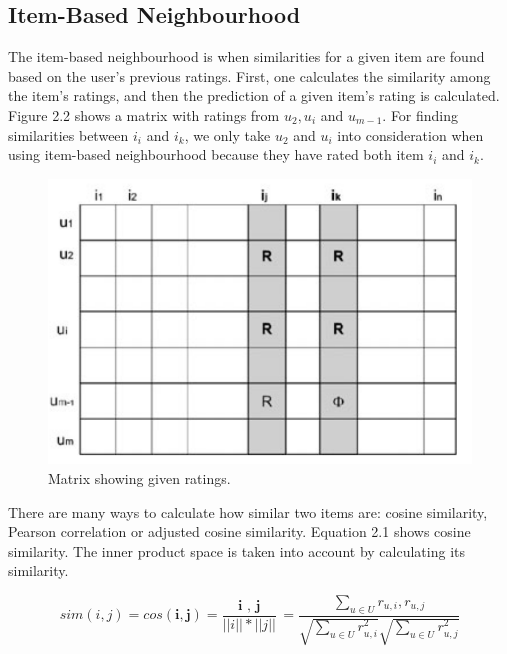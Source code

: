 \subsection{Item-Based Neighbourhood }

The item-based neighbourhood is when similarities for a given item are found based on the user's previous ratings. First, one calculates the similarity among the item's ratings, and then the prediction of a given item's rating is calculated. Figure 2.2 shows a matrix with ratings from  $u_{2}, u_{i}$ and $u_{m-1}$. For finding similarities between $i_{i}$ and $i_{k}$, we only take $u_{2}$ and  $u_{i}$ into consideration when using item-based neighbourhood because they have rated both item $i_{i}$ and $i_{k}$.  

\begin{figure}[H]
	\includegraphics[scale=0.65]{images/neigbourhood_based}
	\centering
	\caption{Matrix showing given ratings. \citep{celma_recommendation_2010}} 
\end{figure}

There are many ways to calculate how similar two items are: cosine similarity, Pearson correlation or adjusted cosine similarity. Equation 2.1 shows cosine similarity. The inner product space is taken into account by calculating its similarity.

\begin{equation}
	sim(i , j) = cos( \textbf{i}, \textbf{j} ) = \frac{ \textbf{ i }, \textbf{ j }}{ || i || * || j || } = \frac{ \sum_{ u \in U } r_{ u, i }, r_{ u, j }} { \sqrt{ \sum _{  u \in U } r^{2}_{ u , i}} \sqrt{ \sum _{  u \in U } r^{2}_{ u , j}}}
\end{equation}

